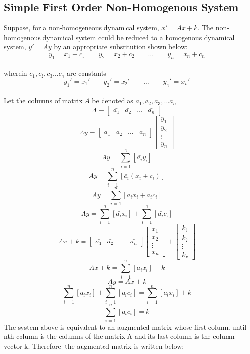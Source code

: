 \documentclass[a4paper, 12pt]{report}
\def\l{\left}
\def\r{\right}
\def\b{\bar}
\begin{document}
\begin{center}
\subsection{Simple First Order Non-Homogenous System}
Suppose, for a non-homogeneous dynamical system, $x' = Ax + k$. The non-homogenous dynamical system could be reduced to a homogenous dynamical system, $y' = Ay$ by an appropriate substitution shown below:  
$$y_1 = x_1 + c_1 \qquad y_2 = x_2 + c_2 \qquad \dots \qquad y_n = x_n + c_n $$
\\wherein $c_1, c_2, c_3 \dots c_n$ are constants
$$y_1' = x_1' \qquad y_2' = x_2' \qquad \dots \qquad y_n' = x_n'$$
\\Let the columns of matrix $A$ be denoted as $a_1, a_2, a_3,\dots a_n$
$$A = \begin{bmatrix} \b{a_1} & \b{a_2} &\dots & \b{a_n} \end{bmatrix}$$
$$Ay = \begin{bmatrix} \b{a_1} & \b{a_2} &\dots & \b{a_n} \end{bmatrix} \begin{bmatrix}y_1 \\ y_2 \\ \vdots \\ y_n \end{bmatrix}$$
$$Ay = \sum_{i = 1} ^ {n} \l[\b{a_i}y_i\r]$$
$$Ay = \sum_{i = 1} ^ {n} \l[\b{a_i}(x_i +c_i)\r]$$
$$Ay = \sum_{i = 1} ^ {n} \l[\b{a_i}x_i + \b{a_i}c_i\r]$$
$$Ay = \sum_{i = 1} ^ {n} \l[\b{a_i}x_i\r] + \sum_{i = 1} ^ {n} \l[\b{a_i}c_i\r]$$
$$Ax + k= \begin{bmatrix} \b{a_1} & \b{a_2} &\dots & \b{a_n} \end{bmatrix} \begin{bmatrix}x_1 \\ x_2 \\ \vdots \\ x_n \end{bmatrix} + \begin{bmatrix} k_1 \\k_2 \\\vdots \\k_n\end{bmatrix}$$
$$Ax + k = \sum_{i = 1}^{n} \l[\b{a_i}x_i\r] + k$$
$$Ay = Ax + k$$
$$\sum_{i = 1} ^ {n} \l[\b{a_i}x_i\r] + \sum_{i = 1} ^ {n} \l[\b{a_i}c_i\r] = \sum_{i = 1}^{n} \l[\b{a_i}x_i\r] + k$$
$$\sum_{i = 1} ^ {n} \l[\b{a_i}c_i\r] =  k$$
The system above is equivalent to an augmented matrix whose first column until nth column is the columns of the matrix A and its last column is the column vector k. Therefore, the augmented matrix is written below:

\end{center}
\end{document}

